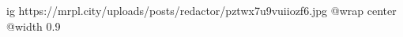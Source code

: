  
 
 
 
 

\ifcmt
  ig https://mrpl.city/uploads/posts/redactor/pztwx7u9vuiiozf6.jpg
  @wrap center
  @width 0.9
\fi
